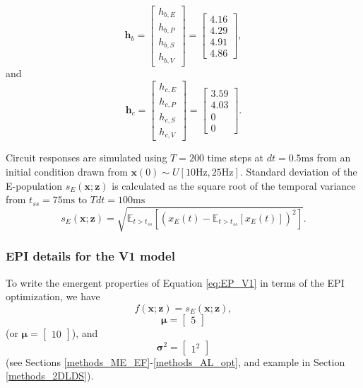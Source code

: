 \documentclass[11pt]{article}
\begin{document}
\begin{equation}
\mathbf{h}_b =  \begin{bmatrix} h_{b,E} \\ h_{b,P} \\ h_{b,S} \\ h_{b,V} \end{bmatrix} =
 \begin{bmatrix} 4.16 \\ 4.29 \\ 4.91 \\ 4.86 \end{bmatrix} ,
\end{equation} 
and
\begin{equation} 
\mathbf{h}_c = \begin{bmatrix} h_{c,E} \\ h_{c,P} \\ h_{c,S} \\ h_{c,V} \end{bmatrix} = 
\begin{bmatrix} 3.59 \\ 4.03 \\ 0 \\ 0 \end{bmatrix}.
\end{equation} 

Circuit responses are simulated using $T = 200$ time steps at $dt = 0.5\text{ms}$ from an initial condition drawn from $\mathbf{x}(0) \sim U\left[10\text{Hz}, 25\text{Hz}\right]$.
Standard deviation of the E-population $s_E(\mathbf{x}; \mathbf{z})$ is calculated as the square root of the temporal variance from $t_{ss} = 75\text{ms}$ to $Tdt = 100\text{ms}$
\begin{equation}
s_E(\mathbf{x}; \mathbf{z}) =\sqrt{\mathbb{E}_{t > t_{ss}}\left[\left(x_E(t) -\mathbb{E}_{t > t_{ss}}\left[ x_E(t) \right]\right)^2 \right]} .
\end{equation}

\subsubsection{EPI details for the V1 model}
To write the emergent properties of Equation \ref{eq:EP_V1} in terms of the EPI optimization, we have
\begin{equation} 
f(\mathbf{x}; \mathbf{z}) = s_E(\mathbf{x}; \mathbf{z}),
\end{equation}
\begin{equation} 
\bm{\mu} = \begin{bmatrix} 5 \end{bmatrix}
\end{equation}
(or $\bm{\mu} = \begin{bmatrix} 10 \end{bmatrix}$), and
\begin{equation} 
\bm{\sigma}^2 = \begin{bmatrix} 1^2 \end{bmatrix}
\end{equation}
(see Sections \ref{methods_ME_EF}-\ref{methods_AL_opt}, and example in Section \ref{methods_2DLDS}).
\end{document}

